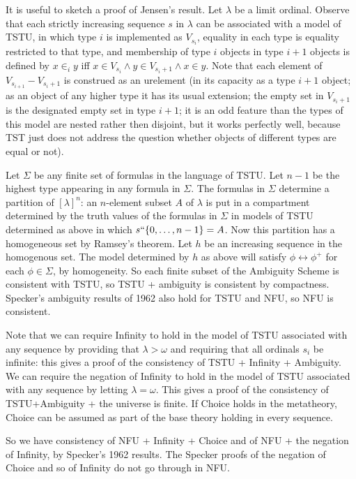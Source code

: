 \documentclass{slides}
\begin{document}
\begin{slide}

It is useful to sketch a proof of Jensen's result.  Let $\lambda$ be a limit ordinal.  Observe that each strictly increasing sequence $s$ in $\lambda$ can be associated with a model of TSTU, in which type $i$ is implemented
as $V_{s_i}$, equality in each type is equality restricted to that type, and membership of type $i$ objects in type $i+1$ objects is defined by $x \in_i y$ iff $x \in V_{s_i} \wedge y \in V_{s_i+1} \wedge x \in y$.  Note that each element of $V_{s_{i+1}} - V_{s_i+1}$ is construed as an urelement (in its capacity as a type $i+1$ object; as an object of any higher type it has its usual extension;  the empty set in $V_{s_i+1}$ is the designated empty set in type $i+1$;  it is an odd feature than the types of this model are nested rather then disjoint, but it works perfectly well, because TST just does not address the question whether objects of different types are equal or not).

\end{slide}
\begin{slide}
Let $\Sigma$ be any finite set of formulas in the language of TSTU.  Let $n-1$ be the highest type appearing in any formula in $\Sigma$.  The formulas in $\Sigma$ determine a partition of $[\lambda]^n$:  an $n$-element subset $A$ of $\lambda$ is put in a compartment determined by the truth values of the formulas in $\Sigma$ in models of TSTU determined as above in which $s``\{0,\ldots,n-1\}=A$.  Now this partition has a homogeneous set by Ramsey's theorem.  Let $h$ be an increasing sequence in the homogenous set.  The model determined by $h$ as above will satisfy $\phi \leftrightarrow \phi^+$ for each $\phi \in \Sigma$, by homogeneity.  So each finite subset of the Ambiguity Scheme is consistent with TSTU, so TSTU + ambiguity is consistent by compactness.  Specker's ambiguity results of 1962 also hold for TSTU and NFU, so NFU is consistent.

\end{slide}
\begin{slide}

Note that we can require Infinity to hold in the model of TSTU associated with any sequence by providing that $\lambda>\omega$ and requiring that all ordinals $s_i$ be infinite:  this gives a proof of the consistency of TSTU + Infinity + Ambiguity.  We can require the negation of Infinity to hold in the model of TSTU associated with any sequence by letting $\lambda=\omega$.  This gives a proof of the consistency of TSTU+Ambiguity + the universe is finite.   If Choice holds in the metatheory, Choice can be assumed as part of the base theory holding in every sequence.

So we have consistency of NFU + Infinity + Choice and of NFU + the negation of Infinity, by Specker's 1962 results.  The Specker proofs of the negation of Choice and so of Infinity do not go through in NFU.

\end{slide}
\end{document}
